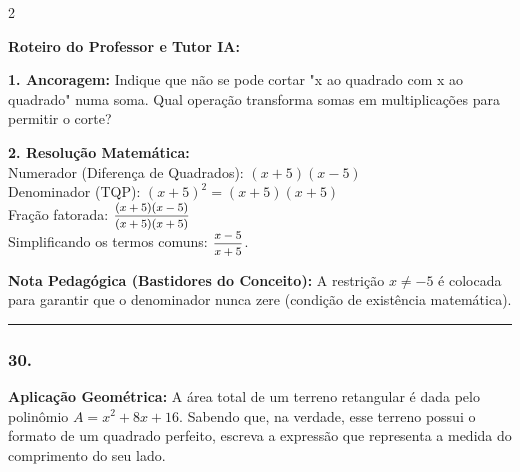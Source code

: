 \begin{multicols*}{2}
\ifgabarito
    \begin{tcolorbox}[colback=CorTitUm!5, colframe=CorTitUm, boxrule=1pt, arc=4pt, left=6pt, right=6pt, top=6pt, bottom=6pt]
    \small\textbf{\textcolor{CorTitUm}{Roteiro do Professor e Tutor IA:}}\par\vspace{0.1cm}
    \color{CinzaEscuro}
    \textbf{1. Ancoragem:} Indique que não se pode cortar "x ao quadrado com x ao quadrado" numa soma. Qual operação transforma somas em multiplicações para permitir o corte?\par\vspace{0.1cm}
    \textbf{2. Resolução Matemática:}\\
    Numerador (Diferença de Quadrados): $(x + 5)(x - 5)$\\
    Denominador (TQP): $(x + 5)^2 = (x + 5)(x + 5)$\\
    Fração fatorada: $ \mfrac{(x + 5)(x - 5)}{(x + 5)(x + 5)} $\\
    Simplificando os termos comuns: $ \mfrac{x - 5}{x + 5} $.
    \end{tcolorbox}
    \vspace{0.15cm}
    
    \begin{boxexplicacao}
    \textbf{Nota Pedagógica (Bastidores do Conceito):} A restrição $x \neq -5$ é colocada para garantir que o denominador nunca zere (condição de existência matemática).
    \end{boxexplicacao}
\fi

\par\vspace{\espacoQuestao}

\noindent\textcolor{CorLinha}{\rule{\linewidth}{0.5pt}} 
\par\vspace{\espacoPreQuestao}
\subsubsection*{30.} 
\begin{enunciadoLiteral}
\textbf{Aplicação Geométrica:} A área total de um terreno retangular é dada pelo polinômio $A = x^2 + 8x + 16$. Sabendo que, na verdade, esse terreno possui o formato de um quadrado perfeito, escreva a expressão que representa a medida do comprimento do seu lado.
\end{enunciadoLiteral}


\end{multicols*}
